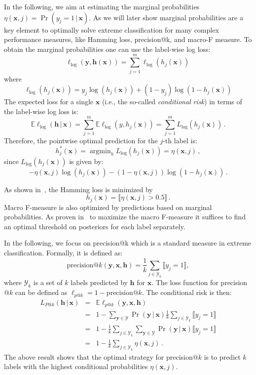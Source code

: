 \documentclass{article}
\renewcommand{\vec}[1]{\boldsymbol{#1}}
\newcommand{\bx}{\vec{x}}
\newcommand{\by}{\vec{y}}
\newcommand{\bh}{\vec{h}}
\newcommand{\calY}{\mathcal{Y}}
\newcommand{\loss}{L}
\newcommand{\assert}[1]{\llbracket #1 \rrbracket}
\newcommand{\given}{\, | \,}
\DeclareMathOperator*{\argmin}{\arg \min}
\begin{document}
In the following, we aim at estimating the marginal probabilities $\eta(\bx,j) = \Pr(y_j = 1 \given \bx)$. As we will later show marginal probabilities are a key element to optimally solve extreme classification for many complex performance measures, like Hamming loss, precision@k, and macro-F measure. 
To obtain the marginal probabilities one can use the label-wise log loss:
$$
\ell_{\log}(\by, \bh(\bx))  = \sum_{j=1}^m \ell_{\log}(h_j(\bx)) \,
$$
where 
$$
\ell_{\log}(h_j(\bx)) = y_j \log(h_j(\bx)) + (1-y_j) \log(1-h_j(\bx)) 
$$
The expected loss for a single $\bx$ (i.e., the so-called \emph{conditional risk}) in terms of the label-wise log loss is:
$$
\mathbb{E} \ell_{\log}(\bh \given \bx) =  \sum_{j=1}^m \mathbb{E}{\ell_{\log}(y, h_j(\bx))} = \sum_{j=1}^m \loss_{\log}(h_j(\bx))\,. %
$$
Therefore, the pointwise optimal prediction for the $j$-th label is:
$$
 h_j^*(\bx)  = \argmin_h \loss_{\log}(h_j(\bx)) = \eta(\bx, j) \,,
$$
since $\loss_{\log}(h_j(\bx))$ is given by:
$$
-\eta(\bx,j) \log(h_j(\bx)) - (1-\eta(\bx,j) ) \log(1 \!-\! h_j(\bx)) \,.
$$

As shown in~\citep{Dembczynski_et_al_2010}, the Hamming loss is minimized by 
$$
h_j(\bx) = \assert{\eta(\bx,j) > 0.5} \,.
$$
Macro F-measure is also optimized by predictions based on marginal probabilities. As proven in~\citep{}  to maximize the macro F-measure it suffices to find an optimal threshold on posteriors for each label separately. 

In the following, we focus on precision@k which is a standard measure in extreme classification. Formally, it is defined as:
\begin{equation}
\mathrm{precision}@k(\by, \bx, \bh) = \frac{1}{k} \sum_{j \in \calY_k} \assert{y_j = 1},
\label{eqn:precision-at-k}
\end{equation}
where $\calY_k$ is a set of $k$ labels predicted by $\bh$ for $\bx$.
%
The loss function for precision$@k$ can be defined as $\ell_{p@k} = 1 - \mathrm{precision}@k$. The conditional risk is then:
\begin{eqnarray*}
\loss_{P@k}(\bh \given \bx) & = & \mathbb{E} \ell_{p@k}(\by,\bx, \bh) \\
& = & 1 - \sum_{\by \in \calY} \Pr(\by \given \bx) \frac{1}{k} \sum_{j \in \calY_k} \assert{y_j = 1} \\
& = & 1 - \frac{1}{k} \sum_{j \in \calY_k} \sum_{\by \in \calY} \Pr(\by \given \bx) \assert{y_j = 1} \\
& = & 1 - \frac{1}{k} \sum_{j \in \calY_k} \eta(\bx,j) \,.
\end{eqnarray*}
%
The above result shows that the optimal strategy for precision$@k$ is to predict $k$ labels
with the highest conditional probabilities $\eta(\bx,j)$.
\end{document}
